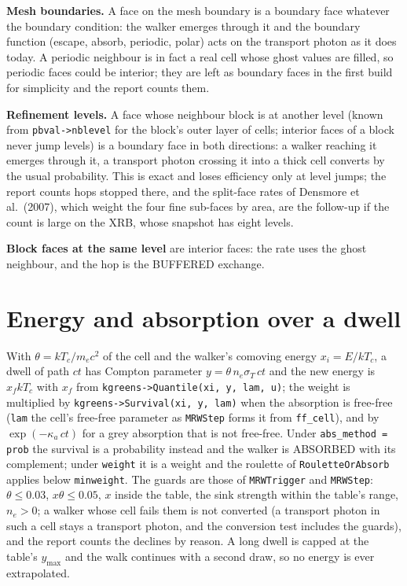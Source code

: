 \documentclass[11pt]{article}
\newcommand{\key}[1]{\texttt{#1}}
\begin{document}
\textbf{Mesh boundaries.}  A face on the mesh boundary is a boundary face whatever the
boundary condition: the walker emerges through it and the boundary function
(escape, absorb, periodic, polar) acts on the transport photon as it does today.  A
periodic neighbour is in fact a real cell whose ghost values are filled, so periodic
faces could be interior; they are left as boundary faces in the first build for
simplicity and the report counts them.

\textbf{Refinement levels.}  A face whose neighbour block is at another level (known
from \texttt{pbval->nblevel} for the block's outer layer of cells; interior faces of a
block never jump levels) is a boundary face in both directions: a walker reaching it
emerges through it, a transport photon crossing it into a thick cell converts by the
usual probability.  This is exact and loses efficiency only at level jumps; the report
counts hops stopped there, and the split-face rates of Densmore et al.\ (2007), which
weight the four fine sub-faces by area, are the follow-up if the count is large on the
XRB, whose snapshot has eight levels.

\textbf{Block faces at the same level} are interior faces: the rate uses the ghost
neighbour, and the hop is the BUFFERED exchange.

\section{Energy and absorption over a dwell}
\label{sec:energy}

With $\theta = kT_c/m_ec^2$ of the cell and the walker's comoving energy $x_i = E/kT_c$,
a dwell of path $ct$ has Compton parameter $y = \theta\,n_e\sigma_T\,ct$ and the new
energy is $x_f kT_c$ with $x_f$ from \texttt{kgreens->Quantile(xi, y, lam, u)}; the
weight is multiplied by \texttt{kgreens->Survival(xi, y, lam)} when the absorption is
free-free (\texttt{lam} the cell's free-free parameter as \texttt{MRWStep} forms it from
\texttt{ff\_cell}), and by $\exp(-\kappa_a\,ct)$ for a grey absorption that is not
free-free.  Under \key{abs\_method = prob} the survival is a probability instead and the
walker is ABSORBED with its complement; under \key{weight} it is a weight and the
roulette of \texttt{RouletteOrAbsorb} applies below \key{minweight}.  The guards are
those of \texttt{MRWTrigger} and \texttt{MRWStep}: $\theta\le0.03$, $x\theta\le0.05$,
$x$ inside the table, the sink strength within the table's range, $n_e>0$; a walker
whose cell fails them is not converted (a transport photon in such a cell stays a
transport photon, and the conversion test includes the guards), and the report counts
the declines by reason.  A long dwell is capped at the table's $y_{\max}$ and the walk
continues with a second draw, so no energy is ever extrapolated.
\end{document}
